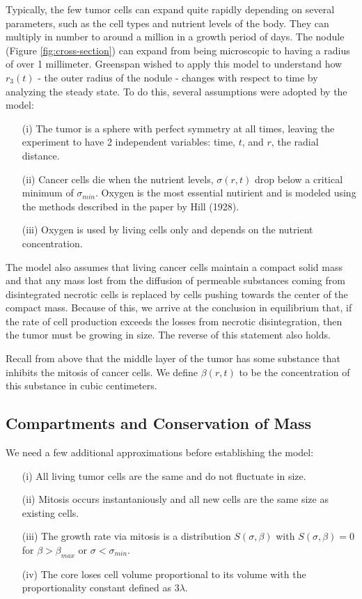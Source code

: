 \documentclass{article}
\begin{document}
Typically, the few tumor cells can expand quite rapidly depending on several parameters, such as the cell types and nutrient levels of the body.
They can multiply in number to around a million in a growth period of days. The nodule (Figure \ref{fig:cross-section}) can expand from being microscopic
to having a radius of over 1 millimeter. Greenspan wished to apply this model to understand how $r_3(t)$ - the outer radius of the nodule - changes
with respect to time by analyzing the steady state. To do this, several assumptions were adopted by the model:

\begin{enumerate}
    \item[(i)] The tumor is a sphere with perfect symmetry at all times, leaving the experiment to have 2 independent variables: time, $t$, and $r$, the radial distance.
    \item[(ii)] Cancer cells die when the nutrient levels, $\sigma(r, t)$ drop below a critical minimum of $\sigma_{min}.$ Oxygen is the most essential nutirient and is modeled using the methods described in the paper by Hill (1928).
    \item[(iii)] Oxygen is used by living cells only and depends on the nutrient concentration.
\end{enumerate}

The model also assumes that living cancer cells maintain a compact solid mass and that any mass lost from the diffusion of permeable substances coming from
disintegrated necrotic cells is replaced by cells pushing towards the center of the compact mass. Because of this, we arrive at the conclusion in equilibrium that,
if the rate of cell production exceeds the losses from necrotic disintegration, then the tumor must be growing in size. The reverse of this statement also holds.

Recall from above that the middle layer of the tumor has some substance that inhibits the mitosis of cancer cells. We define $\beta(r, t)$ to be the concentration
of this substance in cubic centimeters.

\subsection{Compartments and Conservation of Mass}

We need a few additional approximations before establishing the model:

\begin{enumerate}
    \item[(i)] All living tumor cells are the same and do not fluctuate in size.
    \item[(ii)] Mitosis occurs instantaniously and all new cells are the same size as existing cells.
    \item[(iii)] The growth rate via mitosis is a distribution $S(\sigma, \beta)$ with $S(\sigma, \beta) = 0$ for $\beta > \beta_{max}$ or $\sigma < \sigma_{min}$.
    \item[(iv)] The core loses cell volume proportional to its volume with the proportionality constant defined as $3\lambda$.
\end{enumerate}
\end{document}
